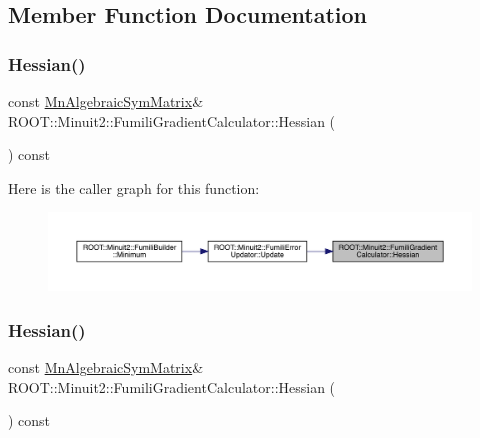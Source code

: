 \subsection{Member Function Documentation}
\mbox{\label{classROOT_1_1Minuit2_1_1FumiliGradientCalculator_aa6c751b836a8ce27b7335d7d3d6a653f}} 
\subsubsection{\texorpdfstring{Hessian()}{Hessian()}\hspace{0.1cm}{\footnotesize\ttfamily [1/3]}}
{\footnotesize\ttfamily const \mbox{\hyperlink{namespaceROOT_1_1Minuit2_a9e74ad97f5537a2e80e52b04d98ecc6e}{Mn\+Algebraic\+Sym\+Matrix}}\& R\+O\+O\+T\+::\+Minuit2\+::\+Fumili\+Gradient\+Calculator\+::\+Hessian (\begin{DoxyParamCaption}{ }\end{DoxyParamCaption}) const\hspace{0.3cm}{\ttfamily [inline]}}

Here is the caller graph for this function\+:
\nopagebreak
\begin{figure}[H]
\begin{center}
\leavevmode
\includegraphics[width=350pt]{d8/de6/classROOT_1_1Minuit2_1_1FumiliGradientCalculator_aa6c751b836a8ce27b7335d7d3d6a653f_icgraph}
\end{center}
\end{figure}
\mbox{\label{classROOT_1_1Minuit2_1_1FumiliGradientCalculator_aa6c751b836a8ce27b7335d7d3d6a653f}} 
\subsubsection{\texorpdfstring{Hessian()}{Hessian()}\hspace{0.1cm}{\footnotesize\ttfamily [2/3]}}
{\footnotesize\ttfamily const \mbox{\hyperlink{namespaceROOT_1_1Minuit2_a9e74ad97f5537a2e80e52b04d98ecc6e}{Mn\+Algebraic\+Sym\+Matrix}}\& R\+O\+O\+T\+::\+Minuit2\+::\+Fumili\+Gradient\+Calculator\+::\+Hessian (\begin{DoxyParamCaption}{ }\end{DoxyParamCaption}) const\hspace{0.3cm}{\ttfamily [inline]}}

